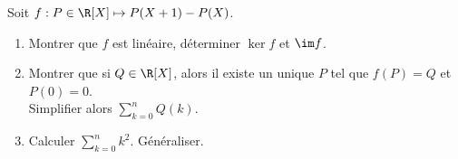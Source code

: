 \begin{enonce}
\begin{exercise}[ID={RMS 122-2 E1310 ENSEA PC},subtitle={},tags={}, difficulty={0}]
Soit $f:P\in\R[X]\mapsto P(X+1)-P(X)$.
\begin{enumerate}
  \item Montrer que $f$ est linéaire, déterminer $\ker f$ et $\im f$.
  \item Montrer que si $Q\in\R[X]$, alors il existe un unique $P$ tel que $f(P)=Q$ et $P(0)=0$.\\
    Simplifier alors $\sum\limits_{k=0}^n Q(k)$.
  \item Calculer $\sum\limits_{k=0}^n k^2$. Généraliser.
\end{enumerate}
\end{exercise}
\begin{solution}
\end{solution}
\end{enonce}
